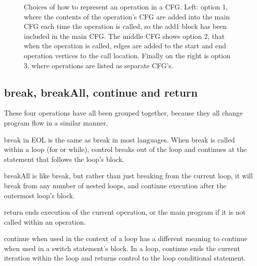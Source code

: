 \begin{figure}
\centering
\begin{minipage}{.3\textwidth}
  \centering
\end{minipage}%
\begin{minipage}{.3\textwidth}
  \centering
\end{minipage}
\begin{minipage}{.3\textwidth}
  \centering
\end{minipage}
\caption{Choices of how to represent an operation in a CFG. Left: option 1, where the contents of the operation's CFG are added into the main CFG each time the operation is called, so the add1 block has been included in the main CFG. The middle CFG shows option 2, that when the operation is called, edges are added to the start and end operation vertices to the call location. Finally on the right is option 3, where operations are listed as separate CFG's. }
\label{fig:operationOptions}
\end{figure}

\subsection{break, breakAll, continue and return}

These four operations have all been grouped together, because they all change program flow in a similar manner.

break in EOL is the same as break in most languages. When break is called within a loop (for or while), control breaks out of the loop and continues at the statement that follows the loop's block.

breakAll is like break, but rather than just breaking from the current loop, it will break from any number of nested loops, and continue execution after the outermost loop's block.

return ends execution of the current operation, or the main program if it is not called within an operation.

continue when used in the context of a loop has a different meaning to continue when used in a switch statement's block. In a loop, continue ends the current iteration within the loop and returns control to the loop conditional statement. 

